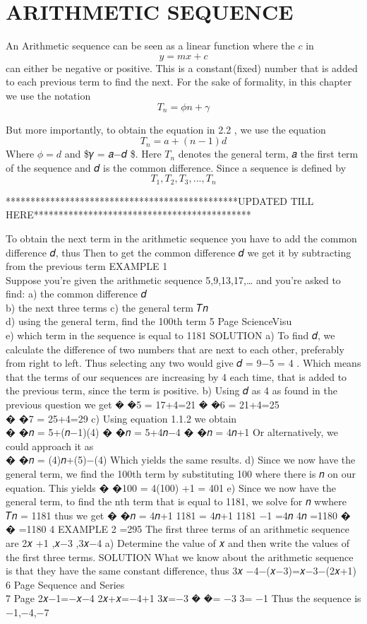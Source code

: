 \documentclass[
  letterpaper,
  DIV=11,
  numbers=noendperiod]{scrreprt}
\begin{document}
\section{ARITHMETIC SEQUENCE}\label{arithmetic-sequence}

An Arithmetic sequence can be seen as a linear function where the \(c\)
in \[y = mx+c \] can either be negative or positive. This is a
constant(fixed) number that is added to each previous term to find the
next. For the sake of formality, in this chapter we use the notation \[
T_n = 𝜙𝑛+𝛾                         
\]

But more importantly, to obtain the equation in 2.2 , we use the
equation \[
T_n= 𝑎+(𝑛−1)𝑑                               
\] Where \(𝜙 = d\) and \$𝛾 = 𝑎−𝑑 \$. Here \(𝑇_𝑛\) denotes the general
term, 𝑎 the first term of the sequence and 𝑑 is the common difference.
Since a sequence is defined by \[
T_1,T_2,T_3,...,T_n
\]

***********************************************UPDATED TILL
HERE********************************************

To obtain the next term in the arithmetic sequence you have to add the
common difference 𝑑, thus Then to get the common difference 𝑑 we get it
by subtracting from the previous term EXAMPLE 1\\
Suppose you're given the arithmetic sequence 5,9,13,17,\ldots{} and
you're asked to find: a) the common difference 𝑑\\
b) the next three terms c) the general term 𝑇𝑛\\
d) using the general term, find the 100th term 5 \textbar{} Page
ScienceVisu\\
e) which term in the sequence is equal to 1181 SOLUTION a) To find 𝑑, we
calculate the difference of two numbers that are next to each other,
preferably from right to left. Thus selecting any two would give 𝑑 = 9−5
= 4 . Which means that the terms of our sequences are increasing by 4
each time, that is added to the previous term, since the term is
positive. b) Using 𝑑 as 4 as found in the previous question we get � �5
= 17+4=21 � �6 = 21+4=25\\
� �7 = 25+4=29 c) Using equation 1.1.2 we obtain\\
� �𝑛 = 5+(𝑛−1)(4) � �𝑛 = 5+4𝑛−4 � �𝑛 = 4𝑛+1 Or alternatively, we could
approach it as\\
� �𝑛 = (4)𝑛+(5)−(4) Which yields the same results. d) Since we now have
the general term, we find the 100th term by substituting 100 where there
is 𝑛 on our equation. This yields � �100 = 4(100) +1 = 401 e) Since we
now have the general term, to find the nth term that is equal to 1181,
we solve for 𝑛 wwhere 𝑇𝑛 = 1181 thus we get � �𝑛 = 4𝑛+1 1181 = 4𝑛+1 1181
−1 =4𝑛 4𝑛 =1180 � � =1180 4 EXAMPLE 2 =295 The first three terms of an
arithmetic sequence are 2𝑥 +1 ,𝑥−3 ,3𝑥−4 a) Determine the value of 𝑥 and
then write the values of the first three terms. SOLUTION What we know
about the arithmetic sequence is that they have the same constant
difference, thus 3𝑥 −4−(𝑥−3)=𝑥−3−(2𝑥+1) 6 \textbar{} Page Sequence and
Series\\
7 \textbar{} Page 2𝑥−1=−𝑥−4 2𝑥+𝑥=−4+1 3𝑥=−3 � �= −3 3= −1 Thus the
sequence is −1,−4,−7
\end{document}
